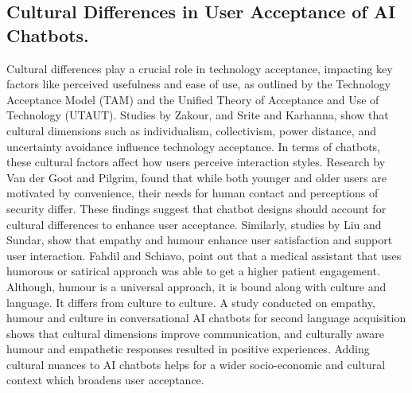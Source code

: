\documentclass[conference]{IEEEtran}
\begin{document}
\subsection{Cultural Differences in User Acceptance of AI Chatbots.}
Cultural differences play a crucial role in technology acceptance, impacting key factors like perceived usefulness and ease of use, as outlined by the Technology Acceptance Model (TAM) and the Unified Theory of Acceptance and Use of Technology (UTAUT). Studies by Zakour\cite{b10}, and Srite and Karhanna\cite{b11}, show that cultural dimensions such as individualism, collectivism, power distance, and uncertainty avoidance influence technology acceptance. In terms of chatbots, these cultural factors affect how users perceive interaction styles. Research by Van der Goot and Pilgrim\cite{b12}, found that while both younger and older users are motivated by convenience, their needs for human contact and perceptions of security differ. These findings suggest that chatbot designs should account for cultural differences to enhance user acceptance\cite{b13}. Similarly, studies by Liu and Sundar\cite{b14}, show that empathy and humour enhance user satisfaction and support user interaction. Fahdil and Schiavo\cite{b15}, point out that a medical assistant that uses humorous or satirical approach was able to get a higher patient engagement. Although, humour is a universal approach, it is bound along with culture and language. It differs from culture to culture. A study conducted on empathy, humour and culture in conversational AI chatbots for second language acquisition shows that cultural dimensions improve communication, and culturally aware humour and empathetic responses resulted in positive experiences. Adding cultural nuances to AI chatbots helps for a wider socio-economic and cultural context which broadens user acceptance\cite{b16}.
\end{document}
